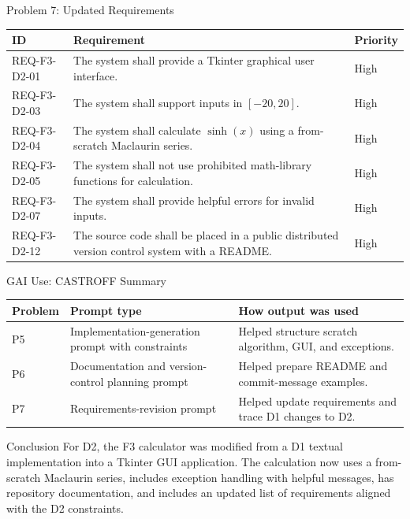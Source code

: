 \documentclass[aspectratio=169,11pt]{beamer}
\begin{document}
\begin{frame}{Problem 7: Updated Requirements}
\small
\begin{tabular}{p{}p{}p{}}
\toprule
\textbf{ID} & \textbf{Requirement} & \textbf{Priority} \\
\midrule
REQ-F3-D2-01 & The system shall provide a Tkinter graphical user interface. & High \\
REQ-F3-D2-03 & The system shall support inputs in $[-20,20]$. & High \\
REQ-F3-D2-04 & The system shall calculate $\sinh(x)$ using a from-scratch Maclaurin series. & High \\
REQ-F3-D2-05 & The system shall not use prohibited math-library functions for calculation. & High \\
REQ-F3-D2-07 & The system shall provide helpful errors for invalid inputs. & High \\
REQ-F3-D2-12 & The source code shall be placed in a public distributed version control system with a README. & High \\
\bottomrule
\end{tabular}
\end{frame}

\begin{frame}{GAI Use: CASTROFF Summary}
\small
\begin{tabular}{p{}p{}p{}}
\toprule
\textbf{Problem} & \textbf{Prompt type} & \textbf{How output was used} \\
\midrule
P5 & Implementation-generation prompt with constraints & Helped structure scratch algorithm, GUI, and exceptions. \\
P6 & Documentation and version-control planning prompt & Helped prepare README and commit-message examples. \\
P7 & Requirements-revision prompt & Helped update requirements and trace D1 changes to D2. \\
\bottomrule
\end{tabular}
\end{frame}



\begin{frame}{Conclusion}
\large
For D2, the F3 calculator was modified from a D1 textual implementation into a Tkinter GUI application. The calculation now uses a from-scratch Maclaurin series, includes exception handling with helpful messages, has repository documentation, and includes an updated list of requirements aligned with the D2 constraints.
\end{frame}
\end{document}
